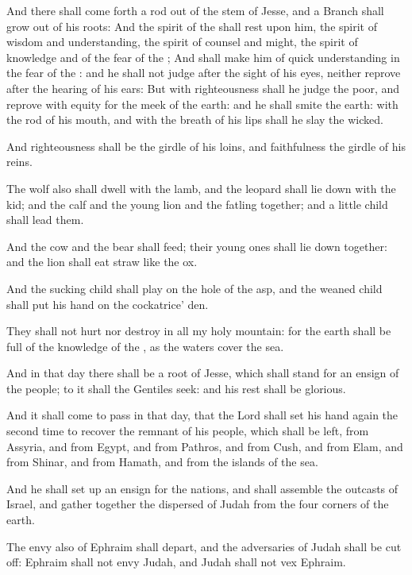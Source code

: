 \Chapter
\Verse And there shall come forth a rod out of the stem of Jesse, and a Branch shall grow out of his roots: \Verse And the spirit of the \LORD shall rest upon him, the spirit of wisdom and understanding, the spirit of counsel and might, the spirit of knowledge and of the fear of the \LORD; \Verse And shall make him of quick understanding in the fear of the \LORD: and he shall not judge after the sight of his eyes, neither reprove after the hearing of his ears: \Verse But with righteousness shall he judge the poor, and reprove with equity for the meek of the earth: and he shall smite the earth: with the rod of his mouth, and with the breath of his lips shall he slay the wicked.

\Verse And righteousness shall be the girdle of his loins, and faithfulness the girdle of his reins.

\Verse The wolf also shall dwell with the lamb, and the leopard shall lie down with the kid; and the calf and the young lion and the fatling together; and a little child shall lead them.

\Verse And the cow and the bear shall feed; their young ones shall lie down together: and the lion shall eat straw like the ox.

\Verse And the sucking child shall play on the hole of the asp, and the weaned child shall put his hand on the cockatrice' den.

\Verse They shall not hurt nor destroy in all my holy mountain: for the earth shall be full of the knowledge of the \LORD, as the waters cover the sea.

\Verse And in that day there shall be a root of Jesse, which shall stand for an ensign of the people; to it shall the Gentiles seek: and his rest shall be glorious.

\Verse And it shall come to pass in that day, that the Lord shall set his hand again the second time to recover the remnant of his people, which shall be left, from Assyria, and from Egypt, and from Pathros, and from Cush, and from Elam, and from Shinar, and from Hamath, and from the islands of the sea.

\Verse And he shall set up an ensign for the nations, and shall assemble the outcasts of Israel, and gather together the dispersed of Judah from the four corners of the earth.

\Verse The envy also of Ephraim shall depart, and the adversaries of Judah shall be cut off: Ephraim shall not envy Judah, and Judah shall not vex Ephraim.

